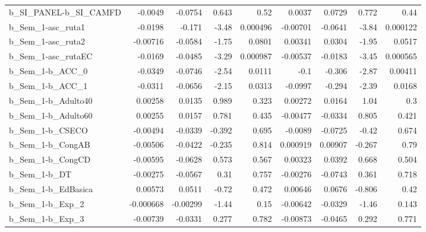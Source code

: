 \begin{tabular}{lrrrrrrrr}
b\_SI\_PANEL-b\_SI\_CAMFD      &     -0.0049 &      -0.0754 &    0.643 &     0.52 &     0.0037 &      0.0729 &        0.772 &          0.44 \\
b\_Sem\_1-asc\_ruta1          &     -0.0198 &       -0.171 &    -3.48 & 0.000496 &   -0.00701 &     -0.0641 &        -3.84 &      0.000122 \\
b\_Sem\_1-asc\_ruta2          &    -0.00716 &      -0.0584 &    -1.75 &   0.0801 &    0.00341 &      0.0304 &        -1.95 &        0.0517 \\
b\_Sem\_1-asc\_rutaEC         &     -0.0169 &      -0.0485 &    -3.29 & 0.000987 &   -0.00537 &     -0.0183 &        -3.45 &      0.000565 \\
b\_Sem\_1-b\_ACC\_0            &     -0.0349 &      -0.0746 &    -2.54 &   0.0111 &       -0.1 &      -0.306 &        -2.87 &       0.00411 \\
b\_Sem\_1-b\_ACC\_1            &     -0.0311 &      -0.0656 &    -2.15 &   0.0313 &    -0.0997 &      -0.294 &        -2.39 &        0.0168 \\
b\_Sem\_1-b\_Adulto40         &     0.00258 &       0.0135 &    0.989 &    0.323 &    0.00272 &      0.0164 &         1.04 &           0.3 \\
b\_Sem\_1-b\_Adulto60         &     0.00255 &       0.0157 &    0.781 &    0.435 &   -0.00477 &     -0.0334 &        0.805 &         0.421 \\
b\_Sem\_1-b\_CSECO            &    -0.00494 &      -0.0339 &   -0.392 &    0.695 &    -0.0089 &     -0.0725 &        -0.42 &         0.674 \\
b\_Sem\_1-b\_CongAB           &    -0.00506 &      -0.0422 &   -0.235 &    0.814 &   0.000919 &     0.00907 &       -0.267 &          0.79 \\
b\_Sem\_1-b\_CongCD           &    -0.00595 &      -0.0628 &    0.573 &    0.567 &    0.00323 &      0.0392 &        0.668 &         0.504 \\
b\_Sem\_1-b\_DT               &    -0.00275 &      -0.0567 &     0.31 &    0.757 &   -0.00276 &     -0.0743 &        0.361 &         0.718 \\
b\_Sem\_1-b\_EdBasica         &     0.00573 &       0.0511 &    -0.72 &    0.472 &    0.00646 &      0.0676 &       -0.806 &          0.42 \\
b\_Sem\_1-b\_Exp\_2            &   -0.000668 &     -0.00299 &    -1.44 &     0.15 &   -0.00642 &     -0.0329 &        -1.46 &         0.143 \\
b\_Sem\_1-b\_Exp\_3            &    -0.00739 &      -0.0331 &    0.277 &    0.782 &   -0.00873 &     -0.0465 &        0.292 &         0.771 \\

\end{tabular}
